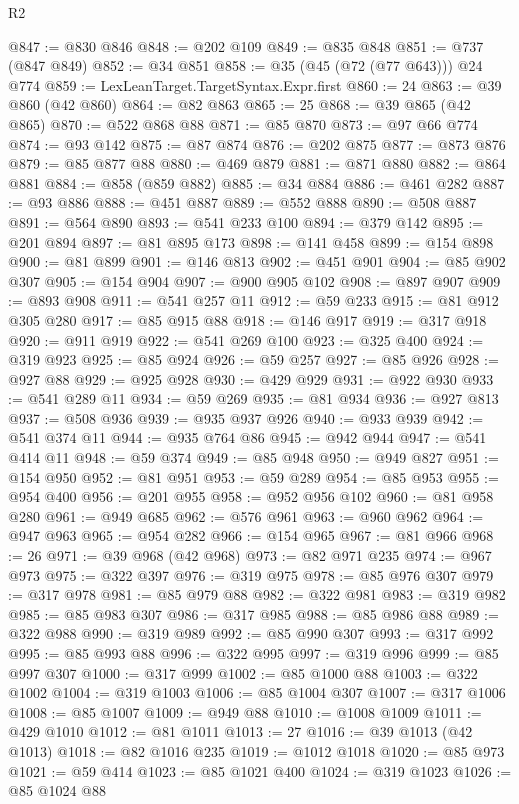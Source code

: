 \begin{lexlean}{R2}
\begin{coremodule}
@847 := @830 @846
@848 := @202 @109
@849 := @835 @848
@851 := @737 (@847 @849)
@852 := @34 @851
@858 := @35 (@45 (@72 (@77 @643))) @24 @774
@859 := LexLeanTarget.TargetSyntax.Expr.first
@860 := 24
@863 := @39 @860 (@42 @860)
@864 := @82 @863
@865 := 25
@868 := @39 @865 (@42 @865)
@870 := @522 @868 @88
@871 := @85 @870
@873 := @97 @66 @774
@874 := @93 @142
@875 := @87 @874
@876 := @202 @875
@877 := @873 @876
@879 := @85 @877 @88
@880 := @469 @879
@881 := @871 @880
@882 := @864 @881
@884 := @858 (@859 @882)
@885 := @34 @884
@886 := @461 @282
@887 := @93 @886
@888 := @451 @887
@889 := @552 @888
@890 := @508 @887
@891 := @564 @890
@893 := @541 @233 @100
@894 := @379 @142
@895 := @201 @894
@897 := @81 @895 @173
@898 := @141 @458
@899 := @154 @898
@900 := @81 @899
@901 := @146 @813
@902 := @451 @901
@904 := @85 @902 @307
@905 := @154 @904
@907 := @900 @905 @102
@908 := @897 @907
@909 := @893 @908
@911 := @541 @257 @11
@912 := @59 @233
@915 := @81 @912 @305 @280
@917 := @85 @915 @88
@918 := @146 @917
@919 := @317 @918
@920 := @911 @919
@922 := @541 @269 @100
@923 := @325 @400
@924 := @319 @923
@925 := @85 @924
@926 := @59 @257
@927 := @85 @926
@928 := @927 @88
@929 := @925 @928
@930 := @429 @929
@931 := @922 @930
@933 := @541 @289 @11
@934 := @59 @269
@935 := @81 @934
@936 := @927 @813
@937 := @508 @936
@939 := @935 @937 @926
@940 := @933 @939
@942 := @541 @374 @11
@944 := @935 @764 @86
@945 := @942 @944
@947 := @541 @414 @11
@948 := @59 @374
@949 := @85 @948
@950 := @949 @827
@951 := @154 @950
@952 := @81 @951
@953 := @59 @289
@954 := @85 @953
@955 := @954 @400
@956 := @201 @955
@958 := @952 @956 @102
@960 := @81 @958 @280
@961 := @949 @685
@962 := @576 @961
@963 := @960 @962
@964 := @947 @963
@965 := @954 @282
@966 := @154 @965
@967 := @81 @966
@968 := 26
@971 := @39 @968 (@42 @968)
@973 := @82 @971 @235
@974 := @967 @973
@975 := @322 @397
@976 := @319 @975
@978 := @85 @976 @307
@979 := @317 @978
@981 := @85 @979 @88
@982 := @322 @981
@983 := @319 @982
@985 := @85 @983 @307
@986 := @317 @985
@988 := @85 @986 @88
@989 := @322 @988
@990 := @319 @989
@992 := @85 @990 @307
@993 := @317 @992
@995 := @85 @993 @88
@996 := @322 @995
@997 := @319 @996
@999 := @85 @997 @307
@1000 := @317 @999
@1002 := @85 @1000 @88
@1003 := @322 @1002
@1004 := @319 @1003
@1006 := @85 @1004 @307
@1007 := @317 @1006
@1008 := @85 @1007
@1009 := @949 @88
@1010 := @1008 @1009
@1011 := @429 @1010
@1012 := @81 @1011
@1013 := 27
@1016 := @39 @1013 (@42 @1013)
@1018 := @82 @1016 @235
@1019 := @1012 @1018
@1020 := @85 @973
@1021 := @59 @414
@1023 := @85 @1021 @400
@1024 := @319 @1023
@1026 := @85 @1024 @88

\end{coremodule}
\end{lexlean}
